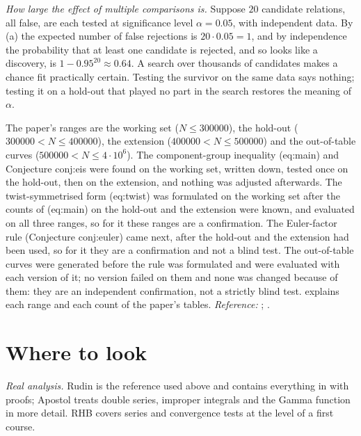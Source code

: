 \emph{How large the effect of multiple comparisons is.} Suppose $20$ candidate relations, all
false, are each tested at significance level $\alpha=0.05$, with independent data. By
(a) the expected number of false rejections is $20\cdot0.05=1$, and by
independence the probability that at least one candidate is rejected, and so looks like a
discovery, is $1-0.95^{20}\approx0.64$. A search over thousands of candidates makes a chance fit
practically certain. Testing the survivor on the same data says nothing; testing it on a hold-out
that played no part in the search restores the meaning of $\alpha$.

\begin{paperlink}\label{pl:prereq:protocol}
The paper's ranges are the working set ($N\le300000$), the hold-out ($300000<N\le400000$), the
extension ($400000<N\le500000$) and the out-of-table curves ($500000<N\le4\cdot10^6$). The
component-group inequality (eq:main) and Conjecture conj:eis were found on the working set, written
down, tested once on the hold-out, then on the extension, and nothing was adjusted afterwards. The
twist-symmetrised form (eq:twist) was formulated on the working set after the counts of (eq:main) on
the hold-out and the extension were known, and evaluated on all three ranges, so for it these ranges
are a confirmation. The Euler-factor rule (Conjecture conj:euler) came next, after the hold-out and
the extension had been used, so for it they are a confirmation and not a blind test. The
out-of-table curves were generated before the rule was formulated and were evaluated with each
version of it; no version failed on them and none was changed because of them: they are an
independent confirmation, not a strictly blind test.  explains each range and each count
of the paper's tables. \emph{Reference:} \cite{Wasserman04}; \cite[Chapter 31]{RHB06}.
\end{paperlink}

\section{Where to look}\label{sec:prereq:books}

\emph{Real analysis.} Rudin \cite{Rudin76} is the reference used above and contains everything in
 with proofs; Apostol \cite{Apostol74} treats double series, improper
integrals and the Gamma function in more detail. RHB \cite[Chapter 4]{RHB06} covers series and
convergence tests at the level of a first course.

